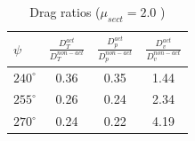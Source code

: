 \begin{table}[H]
	\vspace{0cm}
	\centering
\caption{Drag ratios ($\mu_{sect} = 2.0$ )}
\label{table:D_ratios_mu_2pt0}
\begin{tabular}{|l|c|c|c|}
	\hline
	$ \psi$   & {\large $\frac{D^{act}_{T}}{D^{non-act}_{T}}$} & {\large $\frac{D^{act}_{p}}{D^{non-act}_{p}}$} & {\large $\frac{D^{act}_{v}}{D^{non-act}_{v}}$} \\
	\hline
	\hline
	$240^\circ$ & 0.36 & 0.35 & 1.44   \\
	\hline
	$255^\circ$ & 0.26 & 0.24 & 2.34   \\
	\hline
	$270^\circ$ & 0.24 & 0.22 & 4.19   \\
	\hline
\end{tabular}
\end{table}









